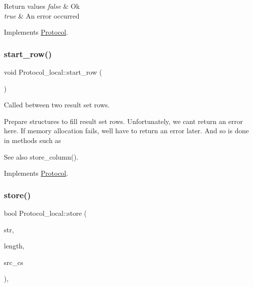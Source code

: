 \begin{DoxyRetVals}{Return values}
{\em false} & Ok \\
\hline
{\em true} & An error occurred \\
\hline
\end{DoxyRetVals}


Implements \mbox{\hyperlink{classProtocol_aa815f52ff0474421cd5db5ea5da84a85}{Protocol}}.

\mbox{\label{classProtocol__local_a9cc8d72321e90ebed9432e01bac634b4}} 
\subsubsection{\texorpdfstring{start\+\_\+row()}{start\_row()}}
{\footnotesize\ttfamily void Protocol\+\_\+local\+::start\+\_\+row (\begin{DoxyParamCaption}{ }\end{DoxyParamCaption})\hspace{0.3cm}{\ttfamily [virtual]}}

Called between two result set rows.

Prepare structures to fill result set rows. Unfortunately, we can\textquotesingle{}t return an error here. If memory allocation fails, we\textquotesingle{}ll have to return an error later. And so is done in methods such as \begin{DoxySeeAlso}{See also}
store\+\_\+column(). 
\end{DoxySeeAlso}


Implements \mbox{\hyperlink{classProtocol_a6935bf41e00716012ba86e1f5c4b055b}{Protocol}}.

\mbox{\label{classProtocol__local_a1504dd8f6389ce0e262ad03d068cda3b}} 
\subsubsection{\texorpdfstring{store()}{store()}\hspace{0.1cm}{\footnotesize\ttfamily [1/2]}}
{\footnotesize\ttfamily bool Protocol\+\_\+local\+::store (\begin{DoxyParamCaption}\item[{const char $\ast$}]{str,  }\item[{size\+\_\+t}]{length,  }\item[{const C\+H\+A\+R\+S\+E\+T\+\_\+\+I\+N\+FO $\ast$}]{src\+\_\+cs }\end{DoxyParamCaption})\hspace{0.3cm}{\ttfamily [protected]}, {\ttfamily [virtual]}}

